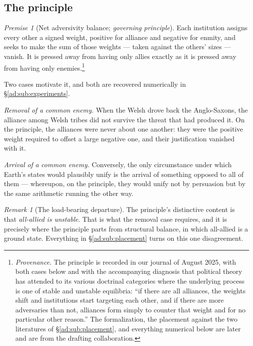 \documentclass[11pt]{article}
\numberwithin{equation}{section}
\theoremstyle{plain}
\theoremstyle{definition}
\theoremstyle{remark}
\newtheorem{remark}[theorem]{Remark}
\newtheorem{premise}{Premise}
\begin{document}
\subsection{The principle}\label{ad:sub:principle}

\setcounter{premise}{6} %
\begin{premise}[Net adversivity balance; \emph{governing principle}]
\label{ad:phi:balance}
Each institution assigns every other a signed weight, positive for
alliance and negative for enmity, and seeks to make the sum of those
weights --- taken against the others' sizes --- vanish. It is pressed
away from having only allies exactly as it is pressed away from having
only enemies.\footnote{%
\emph{Provenance.} The principle is recorded in our journal of
August 2025, with both cases below and with the accompanying diagnosis
that political theory has attended to its various doctrinal categories
where the underlying process is one of stable and unstable equilibria:
``if there are all alliances, the weights shift and institutions start
targeting each other, and if there are more adversaries than not,
alliances form simply to counter that weight and for no particular other
reason.'' The formalization, the placement against the two literatures
of \S\ref{ad:sub:placement}, and everything numerical below are later
and are from the drafting collaboration.}
\end{premise}

Two cases motivate it, and both are recovered numerically in
\S\ref{ad:sub:experiments}.

\emph{Removal of a common enemy.} When the Welsh drove back the
Anglo-Saxons, the alliance among Welsh tribes did not survive the
threat that had produced it. On the principle, the alliances were never
about one another: they were the positive weight required to offset a
large negative one, and their justification vanished with it.

\emph{Arrival of a common enemy.} Conversely, the only circumstance
under which Earth's states would plausibly unify is the arrival of
something opposed to all of them --- whereupon, on the principle, they
would unify not by persuasion but by the same arithmetic running the
other way.

\begin{remark}[The load-bearing departure]\label{ad:rem:departure}
The principle's distinctive content is that \emph{all-allied is
unstable}. That is what the removal case requires, and it is precisely
where the principle parts from structural balance, in which all-allied
is a ground state. Everything in \S\ref{ad:sub:placement} turns on this
one disagreement.
\end{remark}
\end{document}
